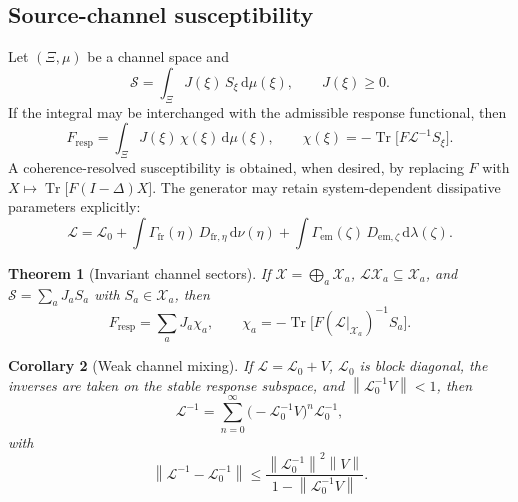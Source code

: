 \documentclass[11pt]{article}
\newtheorem{theorem}{Theorem}[section]
\newtheorem{corollary}[theorem]{Corollary}
\theoremstyle{definition}
\theoremstyle{remark}
\newcommand{\norm}[1]{\left\lVert #1\right\rVert}
\newcommand{\dd}{\mathrm{d}}
\newcommand{\Tr}{\operatorname{Tr}}
\begin{document}
\subsection{Source-channel susceptibility}
Let $(\Xi,\mu)$ be a channel space and
\begin{equation}
  \mathcal S=\int_\Xi J(\xi)\,S_\xi\,\dd\mu(\xi),\qquad J(\xi)\ge 0.
\end{equation}
If the integral may be interchanged with the admissible response functional, then
\begin{equation}
  F_{\mathrm{resp}}=\int_\Xi J(\xi)\,\chi(\xi)\,\dd\mu(\xi),\qquad
  \chi(\xi)=-\Tr\bigl[F\mathcal L^{-1}S_\xi\bigr].
\end{equation}
A coherence-resolved susceptibility is obtained, when desired, by replacing $F$ with
$X\mapsto\Tr\bigl[F(I-\Delta)X\bigr]$.
The generator may retain system-dependent dissipative parameters explicitly:
\begin{equation}
  \mathcal L
  =\mathcal L_0
  +\int \Gamma_{\mathrm{fr}}(\eta)\,D_{\mathrm{fr},\eta}\,\dd\nu(\eta)
  +\int \Gamma_{\mathrm{em}}(\zeta)\,D_{\mathrm{em},\zeta}\,\dd\lambda(\zeta).
\end{equation}

\begin{theorem}[Invariant channel sectors]
If $\mathcal X=\bigoplus_a\mathcal X_a$, $\mathcal L\mathcal X_a\subseteq\mathcal X_a$, and
$\mathcal S=\sum_a J_a S_a$ with $S_a\in\mathcal X_a$, then
\begin{equation}
  F_{\mathrm{resp}}=\sum_a J_a\chi_a,\qquad
  \chi_a=-\Tr\bigl[F(\mathcal L|_{\mathcal X_a})^{-1}S_a\bigr].
\end{equation}
\end{theorem}

\begin{corollary}[Weak channel mixing]
\label{cor:weak-channel-mixing}
If $\mathcal L=\mathcal L_0+V$, $\mathcal L_0$ is block diagonal, the inverses are taken on the stable response subspace, and $\norm{\mathcal L_0^{-1}V}<1$, then
\begin{equation}
  \mathcal L^{-1}=\sum_{n=0}^\infty\bigl(-\mathcal L_0^{-1}V\bigr)^n\mathcal L_0^{-1},
\end{equation}
with
\begin{equation}
  \norm{\mathcal L^{-1}-\mathcal L_0^{-1}}
  \le\frac{\norm{\mathcal L_0^{-1}}^2\norm{V}}{1-\norm{\mathcal L_0^{-1}V}}.
\end{equation}
\end{corollary}
\end{document}

